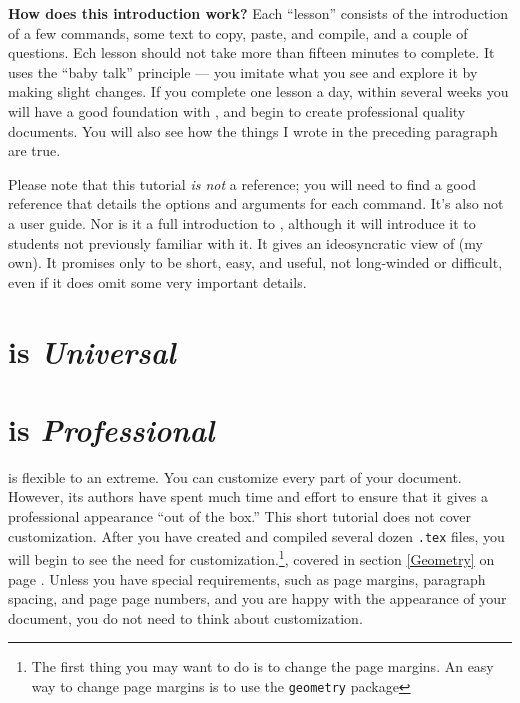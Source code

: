 \documentclass[letterpaper]{article}
\begin{document}
    \textbf{How does this introduction work?} Each ``lesson'' consists of the introduction of a few commands, some text to copy, paste, and compile, and a couple of questions. Ech lesson should not take more than fifteen minutes to complete. It uses the ``baby talk'' principle --- you imitate what you see and explore it by making slight changes. If you complete one lesson a day, within several weeks you will have a good foundation with \LaTeXe{}, and begin to create professional quality documents. You will also see how the things I wrote in the preceding paragraph are true.

    Please note that this tutorial \textit{is not} a \LaTeXe{} reference; you will need to find a good reference that details the options and arguments for each command. It's also not a user guide. Nor is it a full introduction to \LaTeXe{}, although it will introduce it to students not previously familiar with it. It gives an ideosyncratic view of \LaTeXe{} (my own). It promises only to be short, easy, and useful, not long-winded or difficult, even if it does omit some very important details. 

    

    \section*{\LaTeXe{} is \textit{Universal}}

    

    \section*{\LaTeXe{} is \textit{Professional}}

    \LaTeXe{} is flexible to an extreme. You can customize every part of your document. However, its authors have spent much time and effort to ensure that it gives a professional appearance ``out of the box.'' This short tutorial does not cover customization. After you have created and compiled several dozen \texttt{.tex} files, you will begin to see the need for customization.\footnote{The first thing you may want to do is to change the page margins. An easy way to change page margins is to use the \texttt{geometry} package}, covered in section \ref{Geometry} on page \pageref{Geometry}. Unless you have special requirements, such as page margins, paragraph spacing, and page page numbers, and you are happy with the appearance of your document, you do not need to think about customization.
\end{document}
